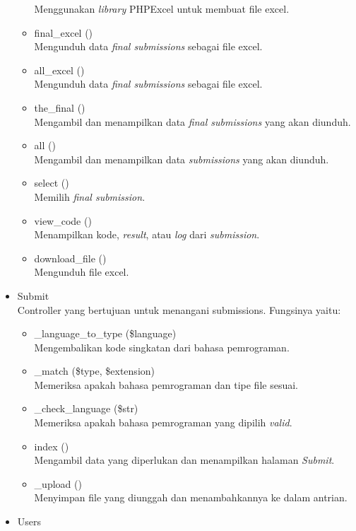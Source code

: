 \begin{itemize}
\begin{itemize}
 Menggunakan \textit{library} PHPExcel untuk membuat file excel.
        \item final\_excel ()\\
 Mengunduh data \textit{final submissions} sebagai file excel.
        \item all\_excel ()\\
        Mengunduh data \textit{final submissions} sebagai file excel.
        \item the\_final ()\\
 Mengambil dan menampilkan data \textit{final submissions} yang akan diunduh.
        \item all () \\
 Mengambil dan menampilkan data \textit{submissions} yang akan diunduh.
        \item select ()\\
 Memilih \textit{final submission}.
        \item view\_code ()\\
 Menampilkan kode, \textit{result}, atau \textit{log} dari \textit{submission}.
        \item download\_file ()\\
 Mengunduh file excel.
    \end{itemize}
        \item Submit \\
 Controller yang bertujuan untuk menangani submissions. Fungsinya yaitu:
        \begin{itemize}
            \item \_language\_to\_type (\$language) \\
 Mengembalikan kode singkatan dari bahasa pemrograman.
            \item \_match (\$type, \$extension) \\
 Memeriksa apakah bahasa pemrograman dan tipe file sesuai.
            \item \_check\_language (\$str) \\
 Memeriksa apakah bahasa pemrograman yang dipilih \textit{valid}.
            \item index ()\\
 Mengambil data yang diperlukan dan menampilkan halaman \textit{Submit}.
            \item \_upload ()\\
 Menyimpan file yang diunggah dan menambahkannya ke dalam antrian.
        \end{itemize}
            \item Users \\

\end{itemize}
